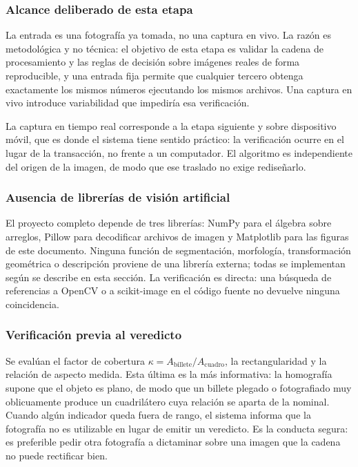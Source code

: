 \documentclass[conference]{IEEEtran}
\begin{document}
\subsubsection{Alcance deliberado de esta etapa}
La entrada es una fotografía ya tomada, no una captura en vivo. La
razón es metodológica y no técnica: el objetivo de esta etapa es
validar la cadena de procesamiento y las reglas de decisión sobre
imágenes reales de forma reproducible, y una entrada fija permite que
cualquier tercero obtenga exactamente los mismos números ejecutando los
mismos archivos. Una captura en vivo introduce variabilidad que
impediría esa verificación.

La captura en tiempo real corresponde a la etapa siguiente y sobre
dispositivo móvil, que es donde el sistema tiene sentido práctico: la
verificación ocurre en el lugar de la transacción, no frente a un
computador. El algoritmo es independiente del origen de la imagen, de
modo que ese traslado no exige rediseñarlo.

\subsubsection{Ausencia de librerías de visión artificial}
El proyecto completo depende de tres librerías: NumPy para el álgebra
sobre arreglos, Pillow para decodificar archivos de imagen y Matplotlib
para las figuras de este documento. Ninguna función de segmentación,
morfología, transformación geométrica o descripción proviene de una
librería externa; todas se implementan según se describe en esta
sección. La verificación es directa: una búsqueda de referencias a
OpenCV o a scikit-image en el código fuente no devuelve ninguna
coincidencia.

\subsubsection{Verificación previa al veredicto}
Se evalúan el factor de cobertura
$\kappa = A_{\text{billete}}/A_{\text{cuadro}}$, la rectangularidad y
la relación de aspecto medida. Esta última es la más informativa: la
homografía supone que el objeto es plano, de modo que un billete
plegado o fotografiado muy oblicuamente produce un cuadrilátero cuya
relación se aparta de la nominal. Cuando algún indicador queda fuera de
rango, el sistema informa que la fotografía no es utilizable en lugar
de emitir un veredicto. Es la conducta segura: es preferible pedir otra
fotografía a dictaminar sobre una imagen que la cadena no puede
rectificar bien.
\end{document}
